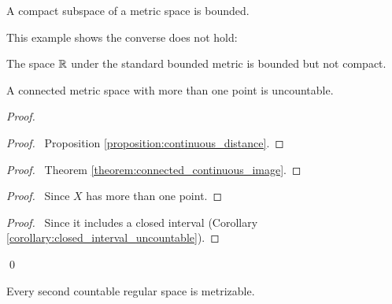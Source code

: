 \begin{proposition}
    \label{proposition:bounded_compact}
    A compact subspace of a metric space is bounded.
\end{proposition}

This example shows the converse does not hold:

\begin{example}
    The space $\mathbb{R}$ under the standard bounded metric is bounded but not compact.
\end{example}

\begin{proposition}
    A connected metric space with more than one point is uncountable.
\end{proposition}

\begin{proof}
    \pf
    \begin{proof}
        \pf\ Proposition \ref{proposition:continuous_distance}.
    \end{proof}
    \begin{proof}
        \pf\ Theorem \ref{theorem:connected_continuous_image}.
    \end{proof}
    \begin{proof}
        \pf\ Since $X$ has more than one point.
    \end{proof}
    \begin{proof}
        \pf\ Since it includes a closed interval (Corollary \ref{corollary:closed_interval_uncountable}).
    \end{proof}
    \qed
\end{proof}

\begin{theorem}
    Every second countable regular space is metrizable.
\end{theorem}

